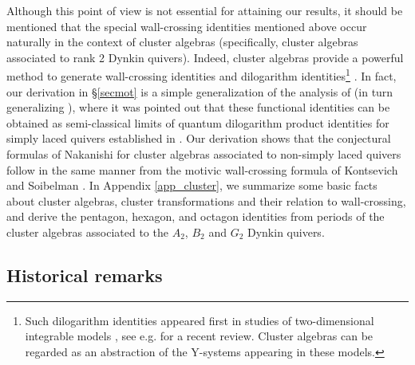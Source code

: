 \documentclass[12pt,reqno]{article}
\numberwithin{equation}{section}
\numberwithin{equation}{section}
\begin{document}
Although this point of view is not essential for attaining our results, it should
be mentioned that the special wall-crossing identities mentioned above occur naturally  in the context
of cluster algebras (specifically, cluster algebras associated to rank 2 Dynkin quivers).
Indeed, cluster algebras provide a powerful method to generate wall-crossing identities
and dilogarithm identities\footnote{Such dilogarithm identities appeared first
in studies of two-dimensional integrable models \cite{Zamolodchikov:1991et,Ravanini:1992fi,Kuniba:1992ev,Gliozzi:1994cs}, see e.g. \cite{Kuniba:2010ir} for a recent review.
Cluster algebras can be regarded as an abstraction of the Y-systems appearing in
these models.}
 \cite{FG,Nakanishi:2009,Nakanishi:2010,Keller:2010,Keller:2010b}.
In fact, our derivation in \S \ref{secmot} is a simple generalization
of the analysis of \cite{Kashaev:2011} (in turn generalizing  \cite{Faddeev:1993rs}),
where it was pointed out
that these functional identities can be obtained as semi-classical limits
of quantum dilogarithm product identities for simply laced quivers
established in \cite{MR2470108,MR2402412,Keller:2011}. Our derivation
shows that the conjectural formulas of Nakanishi \cite{Nakanishi:2010}
for cluster algebras associated to non-simply laced quivers follow in the
same manner from the motivic wall-crossing formula of Kontsevich and
Soibelman \cite{ks}. In  Appendix \ref{app_cluster},  we summarize some basic facts
about cluster algebras, cluster transformations and their relation to wall-crossing,
and derive the pentagon, hexagon, and octagon identities from periods of
the cluster algebras associated to the $A_2$, $B_2$ and $G_2$ Dynkin quivers.

\subsection*{Historical remarks}
\end{document}

